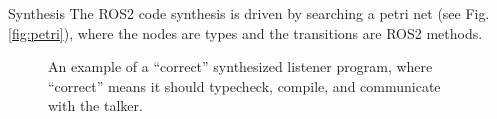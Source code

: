 \documentclass[final]{beamer}
\newlength{\sepwid}
\newlength{\onecolwid}
\begin{document}
\begin{frame}[t]
\begin{columns}[t]
\begin{column}{\sepwid}\end{column} %

\begin{column}{\onecolwid} %

\begin{block}{Synthesis}
The ROS2 code synthesis is driven by searching a petri net (see Fig. \ref{fig:petri}), where the nodes are types and the transitions are ROS2 methods.

\end{block}




\begin{figure}


\caption{An example of a ``correct'' synthesized listener program, where ``correct'' means it should typecheck, compile, and communicate with the talker.}
\end{figure}


\end{column}
\end{columns}
\end{frame}
\end{document}
